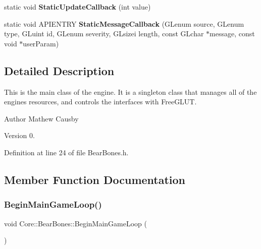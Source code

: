 \begin{DoxyCompactItemize}
\item 
\mbox{\label{class_core_1_1_bear_bones_a5e45a19a314a961e81ab5651f4fbee19}} 
static void {\bfseries Static\+Update\+Callback} (int value)
\item 
\mbox{\label{class_core_1_1_bear_bones_ae6a4688406df0c1b652a1a0e6c82a923}} 
static void A\+P\+I\+E\+N\+T\+RY {\bfseries Static\+Message\+Callback} (G\+Lenum source, G\+Lenum type, G\+Luint id, G\+Lenum severity, G\+Lsizei length, const G\+Lchar $\ast$message, const void $\ast$user\+Param)
\end{DoxyCompactItemize}


\subsection{Detailed Description}
This is the main class of the engine. It is a singleton class that manages all of the engine\textquotesingle{}s resources, and controls the interfaces with Free\+G\+L\+UT. \begin{DoxyAuthor}{Author}
Mathew Causby 
\end{DoxyAuthor}
\begin{DoxyVersion}{Version}
0. 
\end{DoxyVersion}


Definition at line 24 of file Bear\+Bones.\+h.



\subsection{Member Function Documentation}
\mbox{\label{class_core_1_1_bear_bones_ad4258f21b446ccdc93f711bae6aae813}} 
\subsubsection{\texorpdfstring{Begin\+Main\+Game\+Loop()}{BeginMainGameLoop()}}
{\footnotesize\ttfamily void Core\+::\+Bear\+Bones\+::\+Begin\+Main\+Game\+Loop (\begin{DoxyParamCaption}{ }\end{DoxyParamCaption})}

